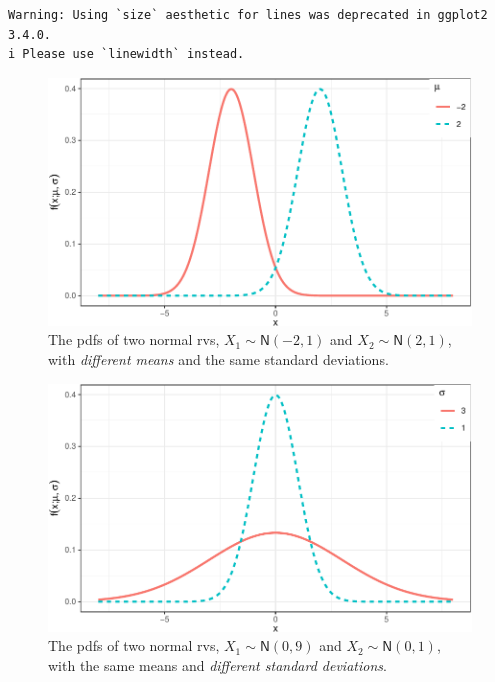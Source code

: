 \documentclass[
  a4paper,
  oneside]{book}
\theoremstyle{definition}
\theoremstyle{definition}
\theoremstyle{definition}
\theoremstyle{plain}
\theoremstyle{remark}
\begin{document}
\begin{verbatim}
Warning: Using `size` aesthetic for lines was deprecated in ggplot2 3.4.0.
i Please use `linewidth` instead.
\end{verbatim}

\begin{figure}[H]

{\centering \includegraphics{01-sampling-distributions_files/figure-pdf/normals-diff-mean-1.pdf}

}

\caption{The pdfs of two normal rvs, \(X_1 \sim \mathsf{N}(-2, 1)\) and
\(X_2 \sim \mathsf{N}(2, 1)\), with \emph{different means} and the same
standard deviations.}

\end{figure}%

\begin{figure}[H]

{\centering \includegraphics{01-sampling-distributions_files/figure-pdf/normals-diff-sd-1.pdf}

}

\caption{The pdfs of two normal rvs, \(X_1 \sim \mathsf{N}(0, 9)\) and
\(X_2 \sim \mathsf{N}(0, 1)\), with the same means and \emph{different
standard deviations}.}

\end{figure}%
\end{document}
